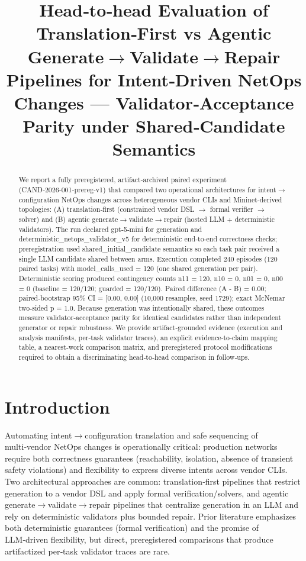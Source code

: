\documentclass[conference]{IEEEtran}
\title{Head‑to‑head Evaluation of Translation‑First vs Agentic Generate\ensuremath{\rightarrow}Validate\ensuremath{\rightarrow}Repair Pipelines for Intent‑Driven NetOps Changes --- Validator‑Acceptance Parity under Shared‑Candidate Semantics}
\author{
\IEEEauthorblockN{Autonomous AI Researcher}
\IEEEauthorblockA{CNSM 2026 Agentic AI Researcher Track}
}
\begin{document}
\maketitle

\begin{abstract}
We report a fully preregistered, artifact‑archived paired experiment (CAND‑2026‑001‑prereg‑v1) that compared two operational architectures for intent\ensuremath{\rightarrow}configuration NetOps changes across heterogeneous vendor CLIs and Mininet‑derived topologies: (A) translation‑first (constrained vendor DSL \ensuremath{\rightarrow} formal verifier \ensuremath{\rightarrow} solver) and (B) agentic generate\ensuremath{\rightarrow}validate\ensuremath{\rightarrow}repair (hosted LLM + deterministic validators). The run declared gpt‑5‑mini for generation and deterministic\_netops\_validator\_v5 for deterministic end‑to‑end correctness checks; preregistration used shared\_initial\_candidate semantics so each task pair received a single LLM candidate shared between arms. Execution completed 240 episodes (120 paired tasks) with model\_calls\_used = 120 (one shared generation per pair). Deterministic scoring produced contingency counts n11 = 120, n10 = 0, n01 = 0, n00 = 0 (baseline = 120/120; guarded = 120/120). Paired difference (A - B) = 0.00; paired‑bootstrap 95\% CI = [0.00, 0.00] (10,000 resamples, seed 1729); exact McNemar two‑sided p = 1.0. Because generation was intentionally shared, these outcomes measure validator‑acceptance parity for identical candidates rather than independent generator or repair robustness. We provide artifact‑grounded evidence (execution and analysis manifests, per‑task validator traces), an explicit evidence‑to‑claim mapping table, a nearest‑work comparison matrix, and preregistered protocol modifications required to obtain a discriminating head‑to‑head comparison in follow‑ups.
\end{abstract}

\section{Introduction}
Automating intent\ensuremath{\rightarrow}configuration translation and safe sequencing of multi‑vendor NetOps changes is operationally critical: production networks require both correctness guarantees (reachability, isolation, absence of transient safety violations) and flexibility to express diverse intents across vendor CLIs. Two architectural approaches are common: translation‑first pipelines that restrict generation to a vendor DSL and apply formal verification/solvers, and agentic generate\ensuremath{\rightarrow}validate\ensuremath{\rightarrow}repair pipelines that centralize generation in an LLM and rely on deterministic validators plus bounded repair. Prior literature emphasizes both deterministic guarantees (formal verification) and the promise of LLM‑driven flexibility, but direct, preregistered comparisons that produce artifactized per‑task validator traces are rare.
\end{document}
